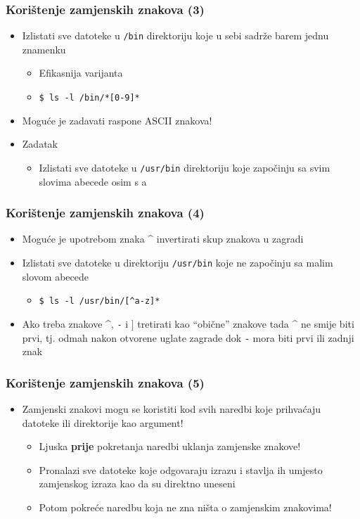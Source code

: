 \documentclass[table,usenames,dvipsnames]{beamer}
\newcommand{\shell}[1]{\texttt{#1}}
\begin{document}
\begin{frame}[t]
\frametitle{Korištenje zamjenskih znakova (3)}
\begin{itemize}
  \item Izlistati sve datoteke u \shell{/bin} direktoriju koje u sebi 
        sadrže barem jednu znamenku
  \begin{itemize}
    \item Efikasnija varijanta
    \item[] \shell{\$ ls -l /bin/*[0-9]*}
  \end{itemize}
  \item Moguće je zadavati raspone ASCII znakova!
  \item Zadatak
  \begin{itemize}
    \item Izlistati sve datoteke u \shell{/usr/bin} direktoriju koje 
          započinju sa svim slovima abecede osim s a
  \end{itemize}
\end{itemize}
\end{frame}

\begin{frame}[t]
\frametitle{Korištenje zamjenskih znakova (4)}
\begin{itemize}
  \item Moguće je upotrebom znaka \textasciicircum{} invertirati skup 
        znakova u zagradi 
  \item Izlistati sve datoteke u direktoriju \shell{/usr/bin} koje ne 
        započinju sa malim slovom abecede
  \begin{itemize}
    \item \shell{\$ ls -l /usr/bin/[\textasciicircum{}a-z]*}
  \end{itemize}
  \item Ako treba znakove \textasciicircum{}, \shell{-} i \shell{$]$} 
        tretirati kao ``obične'' znakove tada \textasciicircum{} ne smije 
        biti prvi, tj. odmah nakon otvorene uglate zagrade dok \shell{-} 
        mora biti prvi ili zadnji znak
\end{itemize}
\end{frame}

\begin{frame}[t]
\frametitle{Korištenje zamjenskih znakova (5)}
\begin{itemize}
  \item Zamjenski znakovi mogu se koristiti kod svih naredbi koje 
        prihvaćaju datoteke ili direktorije kao argument!
  \begin{itemize}
    \item Ljuska \textbf{prije} pokretanja naredbi uklanja zamjenske 
          znakove!
    \item Pronalazi sve datoteke koje odgovaraju izrazu i stavlja ih 
          umjesto zamjenskog izraza kao da su direktno uneseni
    \item Potom pokreće naredbu koja ne zna ništa o zamjenskim znakovima!
  \end{itemize}
\end{itemize}
\end{frame}
\end{document}
